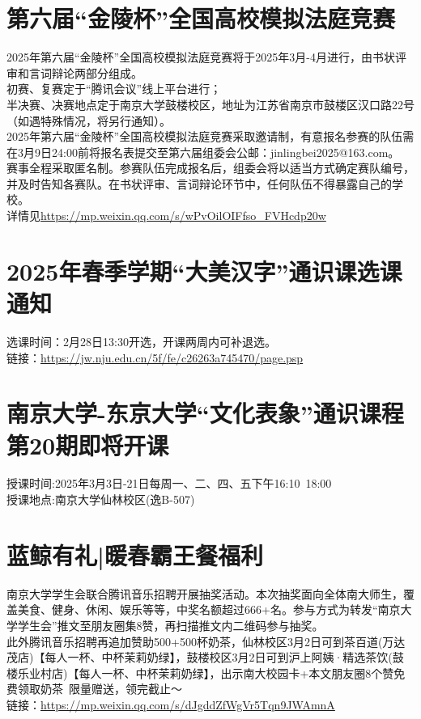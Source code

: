 \documentclass[letterpaper, 12pt]{article}
\begin{document}
\begin{multicols}{2}
\section{第六届“金陵杯”全国高校模拟法庭竞赛}
2025年第六届“金陵杯”全国高校模拟法庭竞赛将于2025年3月-4月进行，由书状评审和言词辩论两部分组成。\\
初赛、复赛定于“腾讯会议”线上平台进行；\\
半决赛、决赛地点定于南京大学鼓楼校区，地址为江苏省南京市鼓楼区汉口路22号（如遇特殊情况，将另行通知）。\\
2025年第六届“金陵杯”全国高校模拟法庭竞赛采取邀请制，有意报名参赛的队伍需在3月9日24:00前将报名表提交至第六届组委会公邮：jinlingbei2025@163.com。\\
赛事全程采取匿名制。参赛队伍完成报名后，组委会将以适当方式确定赛队编号，并及时告知各赛队。在书状评审、言词辩论环节中，任何队伍不得暴露自己的学校。\\
详情见\url{https://mp.weixin.qq.com/s/wPvOilOIFfso_FVHcdp20w}\\

\section{2025年春季学期“大美汉字”通识课选课通知}
选课时间：2月28日13:30开选，开课两周内可补退选。\\
链接：\url{https://jw.nju.edu.cn/5f/fe/c26263a745470/page.psp}\\

\section{南京大学-东京大学“文化表象”通识课程第20期即将开课}
授课时间:2025年3月3日-21日每周一、二、四、五下午16:10~18:00\\
授课地点:南京大学仙林校区(逸B-507)\\

\section{蓝鲸有礼|暖春霸王餐福利}
南京大学学生会联合腾讯音乐招聘开展抽奖活动。本次抽奖面向全体南大师生，覆盖美食、健身、休闲、娱乐等等，中奖名额超过666+名。参与方式为转发“南京大学学生会”推文至朋友圈集8赞，再扫描推文内二维码参与抽奖。\\
此外腾讯音乐招聘再追加赞助500+500杯奶茶，仙林校区3月2日可到茶百道(万达茂店)【每人一杯、中杯茉莉奶绿】，鼓楼校区3月2日可到沪上阿姨·精选茶饮(鼓楼乐业村店)【每人一杯、中杯茉莉奶绿】，出示南大校园卡+本文朋友圈8个赞免费领取奶茶 限量赠送，领完截止～\\
链接：\url{https://mp.weixin.qq.com/s/dJgddZfWgVr5Tqn9JWAmnA}\\


\end{multicols}
\end{document}
